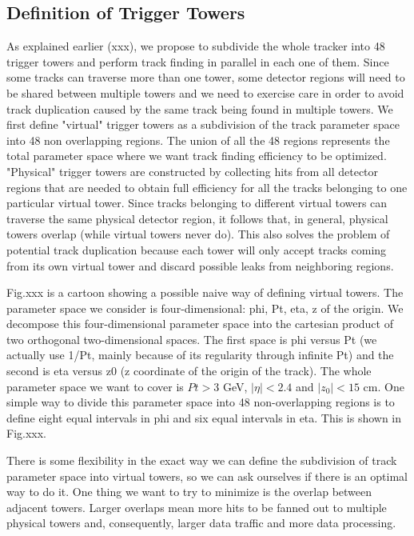 \subsection{Definition of Trigger Towers}

As explained earlier (xxx), we propose to subdivide the whole tracker into 48 trigger towers and perform track finding in parallel in each one of them. Since some tracks can traverse more than one tower, some detector regions will need to be shared between multiple towers and we need to exercise care in order to avoid track duplication caused by the same track being found in multiple towers.
We first define "virtual" trigger towers as a subdivision of the track parameter space into 48 non overlapping regions. The union of all the 48 regions represents the total parameter space where we want track finding efficiency to be optimized. "Physical" trigger towers are constructed by collecting hits from all detector regions that are needed to obtain full efficiency for all the tracks belonging to one particular virtual tower. Since tracks belonging to different virtual towers can traverse the same physical detector region, it follows that, in general, physical towers overlap (while virtual towers never do). This also solves the problem of potential track duplication because each tower will only accept tracks coming from its own virtual tower and discard possible leaks from neighboring regions.

Fig.xxx is a cartoon showing a possible naive way of defining virtual towers. The parameter space we consider is four-dimensional: phi, Pt, eta, z of the origin. We decompose this four-dimensional parameter space into the cartesian product of two orthogonal two-dimensional spaces. The first space is phi versus Pt (we actually use 1/Pt, mainly because of its regularity through infinite Pt) and the second is eta versus z0 (z coordinate of the origin of the track).
The whole parameter space we want to cover is $Pt > 3$ GeV, $|\eta| < 2.4$ and $|z_0| < 15$ cm.
One simple way to divide this parameter space into 48 non-overlapping regions is to define eight equal intervals in phi and six equal intervals in eta. This is shown in Fig.xxx.

There is some flexibility in the exact way we can define the subdivision of track parameter space into virtual towers, so we can ask ourselves if there is an optimal way to do it. One thing we want to try to minimize is the overlap between adjacent towers. Larger overlaps mean more hits to be fanned out to multiple physical towers and, consequently, larger data traffic and more data processing.

